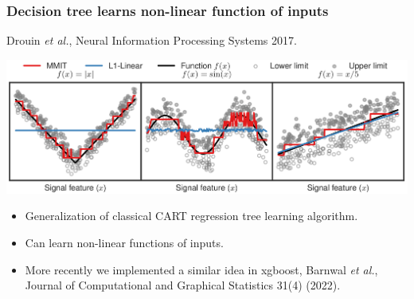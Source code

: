 \documentclass{beamer}
\begin{document}
\begin{frame}
  \frametitle{Decision tree learns non-linear function of inputs}
  
  Drouin \emph{et al.}, Neural Information Processing Systems 2017.

  \includegraphics[width=\linewidth]{mmit-functions}
  \begin{itemize}
  \item Generalization of classical CART regression tree learning algorithm.
  \item Can learn non-linear functions of inputs.
  \item More recently we implemented a similar idea in xgboost,
    Barnwal \emph{et al.}, Journal of Computational and Graphical Statistics 31(4) (2022).
  \end{itemize}
\end{frame}
\end{document}
